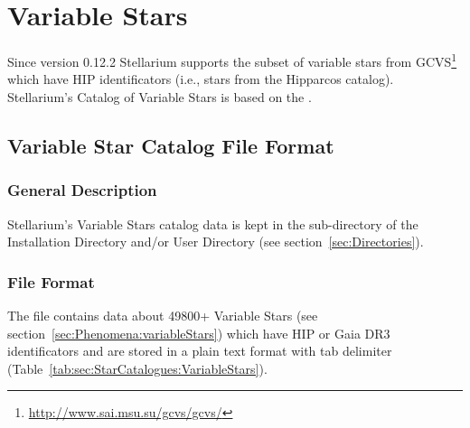 \clearpage

\section{Variable Stars}
\label{sec:StarCatalogues:VariableStars}

Since version 0.12.2 Stellarium supports the subset of variable stars
from GCVS\footnote{\url{http://www.sai.msu.su/gcvs/gcvs/}} which have HIP
identificators (i.e., stars from the Hipparcos catalog). Stellarium's Catalog
of Variable Stars is based on the .

\subsection{Variable Star Catalog File Format}
\label{sec:StarCatalogues:VariableStars:format}

\subsubsection{General Description}%
\label{sec:StarCatalogues:VariableStars:general}

Stellarium's Variable Stars catalog data is kept
in the  sub-directory of the Installation Directory and/or
User Directory (see section~\ref{sec:Directories}).


\subsubsection{File Format}%
\label{sec:StarCatalogues:VariableStars:file}

The  file contains data about 49800+ Variable Stars 
(see section~\ref{sec:Phenomena:variableStars}) which have HIP or Gaia DR3 identificators and
are stored in a plain text format with tab delimiter (Table~\ref{tab:sec:StarCatalogues:VariableStars}).

